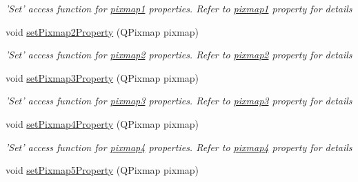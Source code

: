 \begin{DoxyCompactItemize}
\begin{DoxyCompactList}\small\item\em 'Set' access function for \hyperlink{classQELabel_a825fa1c02e643af57502d686354712cc}{pixmap1} properties. Refer to \hyperlink{classQELabel_a825fa1c02e643af57502d686354712cc}{pixmap1} property for details \end{DoxyCompactList}\item 
\hypertarget{classQELabel_ad57ba58a656d66d1d83a442da127055e}{
void \hyperlink{classQELabel_ad57ba58a656d66d1d83a442da127055e}{setPixmap2Property} (QPixmap pixmap)}
\label{classQELabel_ad57ba58a656d66d1d83a442da127055e}

\begin{DoxyCompactList}\small\item\em 'Set' access function for \hyperlink{classQELabel_ac325b3d9005dd3e7747d9124a8b7618c}{pixmap2} properties. Refer to \hyperlink{classQELabel_ac325b3d9005dd3e7747d9124a8b7618c}{pixmap2} property for details \end{DoxyCompactList}\item 
\hypertarget{classQELabel_a52617de263c716d453969e2483dc6b40}{
void \hyperlink{classQELabel_a52617de263c716d453969e2483dc6b40}{setPixmap3Property} (QPixmap pixmap)}
\label{classQELabel_a52617de263c716d453969e2483dc6b40}

\begin{DoxyCompactList}\small\item\em 'Set' access function for \hyperlink{classQELabel_a57180f761e931d984882e18a696feda7}{pixmap3} properties. Refer to \hyperlink{classQELabel_a57180f761e931d984882e18a696feda7}{pixmap3} property for details \end{DoxyCompactList}\item 
\hypertarget{classQELabel_a77dc0fc6ea84f9c684113e5c003ee900}{
void \hyperlink{classQELabel_a77dc0fc6ea84f9c684113e5c003ee900}{setPixmap4Property} (QPixmap pixmap)}
\label{classQELabel_a77dc0fc6ea84f9c684113e5c003ee900}

\begin{DoxyCompactList}\small\item\em 'Set' access function for \hyperlink{classQELabel_ad7454834a438e24744fbaca27cf75f80}{pixmap4} properties. Refer to \hyperlink{classQELabel_ad7454834a438e24744fbaca27cf75f80}{pixmap4} property for details \end{DoxyCompactList}\item 
\hypertarget{classQELabel_abb046af74d3e8f554856e4894714060e}{
void \hyperlink{classQELabel_abb046af74d3e8f554856e4894714060e}{setPixmap5Property} (QPixmap pixmap)}
\label{classQELabel_abb046af74d3e8f554856e4894714060e}


\end{DoxyCompactItemize}

